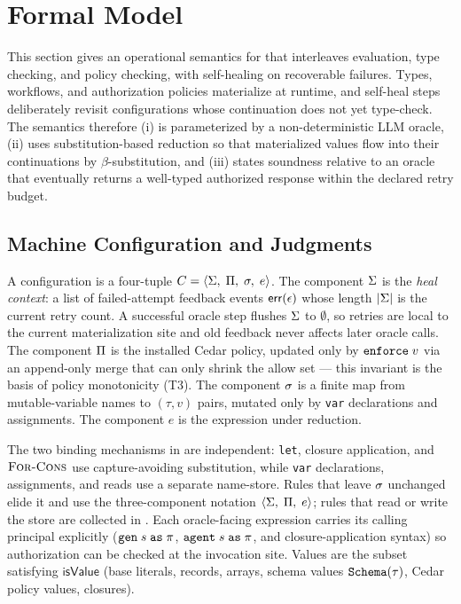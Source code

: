\section{Formal Model}
\label{sec:semantics}

This section gives an operational semantics for \pact that interleaves
evaluation, type checking, and policy checking, with self-healing on
recoverable failures. Types, workflows, and authorization policies
materialize at runtime, and self-heal steps deliberately revisit
configurations whose continuation does not yet type-check. The semantics
therefore (i) is parameterized by a non-deterministic LLM oracle, (ii)
uses substitution-based reduction so that materialized values flow into
their continuations by $\beta$-substitution, and (iii) states soundness
relative to an oracle that eventually returns a well-typed authorized
response within the declared retry budget.

\subsection{Machine Configuration and Judgments}
\label{sec:sem-config}

A \pact configuration is a four-tuple
$C = \langle \Sigma,\; \Pi,\; \sigma,\; e \rangle$. The component $\Sigma$ is the
\emph{heal context}: a list of failed-attempt feedback events
$\mathsf{err}(\epsilon)$ whose length $|\Sigma|$ is the current retry count.
A successful oracle step flushes $\Sigma$ to $\emptyset$, so retries are
local to the current materialization site and old feedback never affects
later oracle calls. The component $\Pi$ is the installed Cedar policy,
updated only by $\texttt{enforce}\;v$ via an append-only merge that can only
shrink the allow set --- this invariant is the basis of policy
monotonicity (T3). The component $\sigma$ is a finite map from
mutable-variable names to $(\tau, v)$ pairs, mutated only by
\texttt{var} declarations and assignments. The component $e$ is the
expression under reduction.

The two binding mechanisms in \pact are independent: \texttt{let},
closure application, and $\textsc{For-Cons}$ use capture-avoiding
substitution, while \texttt{var} declarations, assignments, and reads
use a separate name-store. Rules that leave $\sigma$ unchanged elide it
and use the three-component notation $\langle \Sigma,\; \Pi,\; e \rangle$; rules
that read or write the store are collected in . Each
oracle-facing expression carries its calling principal explicitly
($\texttt{gen}\;s\;\texttt{as}\;\pi$, $\texttt{agent}\;s\;\texttt{as}\;\pi$, and closure-application
syntax) so authorization can be checked at the invocation site. Values
are the subset satisfying $\mathsf{isValue}$ (base literals, records,
arrays, schema values $\texttt{Schema}(\tau)$, Cedar policy values, closures).

